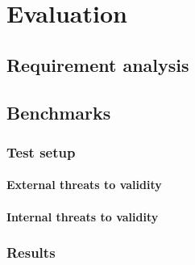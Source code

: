 \chapter{Evaluation}

	\section{Requirement analysis}

	\section{Benchmarks}

	\subsection{Test setup}

		\subsubsection{External threats to validity}

		\subsubsection{Internal threats to validity}

	\subsection{Results}